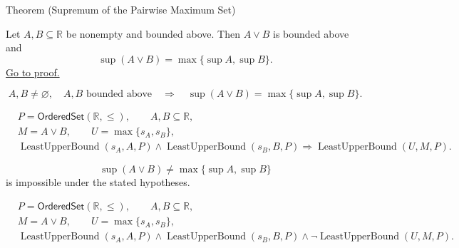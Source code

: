 \begin{theorembox}{Theorem (Supremum of the Pairwise Maximum Set)}
\begin{theorem}
\label{thm:supremum-pairwise-maximum-set}
Let $A,B\subseteq\mathbb{R}$ be nonempty and bounded above. Then $A\vee B$
is bounded above and
\[
\sup(A\vee B)=\max\{\sup A,\sup B\}.
\]
\hyperref[prf:supremum-pairwise-maximum-set]{Go to proof.}
\end{theorem}
\end{theorembox}

\begin{remark*}
\[
A,B\neq\varnothing,\quad A,B\text{ bounded above}
\quad\Longrightarrow\quad
\sup(A\vee B)=\max\{\sup A,\sup B\}.
\]
\end{remark*}

\begin{remark*}
\[
\begin{aligned}
&P=\mathsf{OrderedSet}(\mathbb{R},\leq),\qquad A,B\subseteq\mathbb{R},\\
&M=A\vee B,\qquad U=\max\{s_A,s_B\},\\
&\operatorname{LeastUpperBound}(s_A,A,P)\land\operatorname{LeastUpperBound}(s_B,B,P)
\Longrightarrow
\operatorname{LeastUpperBound}(U,M,P).
\end{aligned}
\]
\end{remark*}

\begin{remark*}
\[
\sup(A\vee B)\neq\max\{\sup A,\sup B\}
\]
is impossible under the stated hypotheses.
\end{remark*}

\begin{remark*}
\[
\begin{aligned}
&P=\mathsf{OrderedSet}(\mathbb{R},\leq),\qquad A,B\subseteq\mathbb{R},\\
&M=A\vee B,\qquad U=\max\{s_A,s_B\},\\
&\operatorname{LeastUpperBound}(s_A,A,P)\land\operatorname{LeastUpperBound}(s_B,B,P)\land
\neg\operatorname{LeastUpperBound}(U,M,P).
\end{aligned}
\]
\end{remark*}

